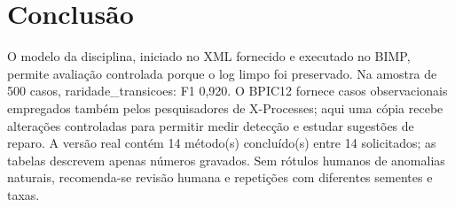 \documentclass[conference]{IEEEtran}
\begin{document}
\clearpage
\section{Conclusão}
O modelo da disciplina, iniciado no XML fornecido e executado no BIMP, permite avaliação controlada porque o log limpo foi preservado. Na amostra de 500 casos, raridade\_transicoes: F1 0,920. O BPIC12 fornece casos observacionais empregados também pelos pesquisadores de X-Processes; aqui uma cópia recebe alterações controladas para permitir medir detecção e estudar sugestões de reparo. A versão real contém 14 método(s) concluído(s) entre 14 solicitados; as tabelas descrevem apenas números gravados. Sem rótulos humanos de anomalias naturais, recomenda-se revisão humana e repetições com diferentes sementes e taxas.



\end{document}
